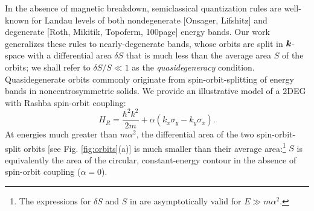 \documentclass[aps, prb, showpacs, twocolumn, notitlepage, superscriptaddress]{revtex4-1}
\begin{document}


In the absence of magnetic breakdown, semiclassical quantization rules are well-known for Landau levels of  both nondegenerate [Onsager, Lifshitz] and degenerate [Roth, Mikitik, Topoferm, 100page] energy bands. Our work generalizes these rules to nearly-degenerate bands, whose orbits are split in $\boldsymbol{k}$-space with a differential area  $\delta S$ that is much less than the average area $S$ of the orbits; we shall refer to $\delta S/S{\ll}1$ as the \textit{quasidegeneracy} condition. Quasidegenerate orbits commonly originate from spin-orbit-splitting of energy bands in noncentrosymmetric solids. We provide an illustrative model of  a 2DEG with Rashba spin-orbit coupling:
\begin{equation}
H_R=\frac{{\hbar^2} k^2}{2m}+\alpha  (k_{x}\sigma_{y}-k_{y}\sigma_{x}).\label{eq:Rashba-Hamiltonian}
\end{equation}
At energies much greater than $m\alpha^2$, the differential area of the two spin-orbit-split orbits [see Fig. \ref{fig:orbits}(a)] is much smaller than their average area:\footnote{The expressions for $\delta S$ and $S$ in  are asymptotically valid for $E{\gg}m\alpha^2$.}
$S$ is equivalently the area of the circular, constant-energy contour in the absence of spin-orbit coupling ($\alpha{=}0$).
\end{document}
